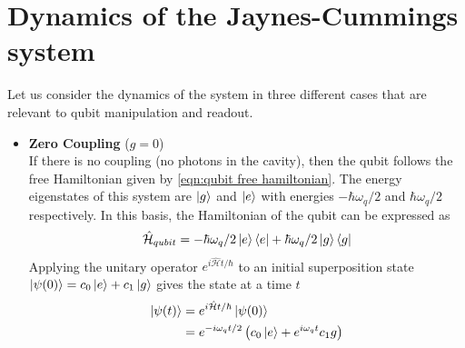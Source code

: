 \section{Dynamics of the Jaynes-Cummings system}

Let us consider the dynamics of the system in three different cases that are relevant to qubit manipulation and readout.
\begin{itemize}
\item \textbf{Zero Coupling} ($g=0$)\\
If there is no coupling (no photons in the cavity), then the qubit follows the free Hamiltonian given by \ref{eqn:qubit free hamiltonian}. The energy eigenstates of this system are $\ket{g}$ and $\ket{e}$ with energies $-\hbar\omega_q/2$ and $\hbar\omega_q/2$ respectively. In this basis, the Hamiltonian of the qubit can be expressed as
\begin{equation}
\hat{\mathcal{H}}_{qubit} = -\hbar\omega_q/2\ket{e}\bra{e} + \hbar\omega_q/2\ket{g}\bra{g}
\end{equation}
Applying the unitary operator $e^{i\hat{\mathcal{H}}t/\hbar}$ to an initial superposition state $\ket{\psi(0)}=c_0\ket{e}+c_1\ket{g}$ gives the state at a time $t$
\begin{align}
\begin{split}
\ket{\psi(t)} &= e^{i\hat{\mathcal{H}}t/\hbar}\ket{\psi(0)}\\
&=e^{-i\omega_qt/2}\left(c_0\ket{e}+e^{i\omega_q t}c_1{g}\right)
\end{split}
\end{align}


\end{itemize}
